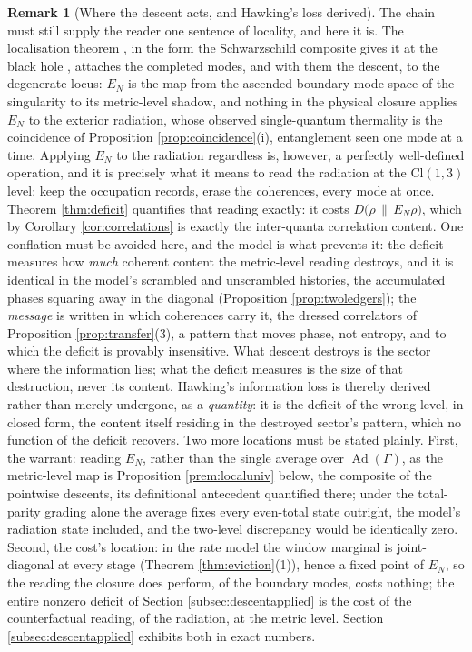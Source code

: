 \documentclass[11pt]{article}
\theoremstyle{definition}
\newtheorem{remark}[theorem]{Remark}
\newcommand{\Cl}{\mathrm{Cl}}
\newcommand{\EN}{E_{N}}
\newcommand{\rel}[2]{D\bigl(#1 \,\|\, #2\bigr)}
\begin{document}
\begin{remark}[Where the descent acts, and Hawking's loss derived]\label{rem:wheredescent}
The chain must still supply the reader one sentence of locality, and here it is. The localisation theorem \cite[Thm.~4.4, Cor.~4.5]{ButlerT4}, in the form the Schwarzschild composite gives it at the black hole \cite[Thms 8.7, 8.12]{ButlerT4}, attaches the completed modes, and with them the descent, to the degenerate locus: $\EN$ is the map from the ascended boundary mode space of the singularity to its metric-level shadow, and nothing in the physical closure applies $\EN$ to the exterior radiation, whose observed single-quantum thermality is the coincidence of Proposition \ref{prop:coincidence}(i), entanglement seen one mode at a time. Applying $\EN$ to the radiation regardless is, however, a perfectly well-defined operation, and it is precisely what it means to read the radiation at the $\Cl(1,3)$ level: keep the occupation records, erase the coherences, every mode at once. Theorem \ref{thm:deficit} quantifies that reading exactly: it costs $\rel{\rho}{\EN\rho}$, which by Corollary \ref{cor:correlations} is exactly the inter-quanta correlation content. One conflation must be avoided here, and the model is what prevents it: the deficit measures how \emph{much} coherent content the metric-level reading destroys, and it is identical in the model's scrambled and unscrambled histories, the accumulated phases squaring away in the diagonal (Proposition \ref{prop:twoledgers}); the \emph{message} is written in which coherences carry it, the dressed correlators of Proposition \ref{prop:transfer}(3), a pattern that moves phase, not entropy, and to which the deficit is provably insensitive. What descent destroys is the sector where the information lies; what the deficit measures is the size of that destruction, never its content. Hawking's information loss is thereby derived rather than merely undergone, as a \emph{quantity}: it is the deficit of the wrong level, in closed form, the content itself residing in the destroyed sector's pattern, which no function of the deficit recovers. Two more locations must be stated plainly. First, the warrant: reading $\EN$, rather than the single average over $\operatorname{Ad}(\Gamma)$, as the metric-level map is Proposition \ref{prem:localuniv} below, the composite of the pointwise descents, its definitional antecedent quantified there; under the total-parity grading alone the average fixes every even-total state outright, the model's radiation state included, and the two-level discrepancy would be identically zero. Second, the cost's location: in the rate model the window marginal is joint-diagonal at every stage (Theorem \ref{thm:eviction}(1)), hence a fixed point of $\EN$, so the reading the closure does perform, of the boundary modes, costs nothing; the entire nonzero deficit of Section \ref{subsec:descentapplied} is the cost of the counterfactual reading, of the radiation, at the metric level. Section \ref{subsec:descentapplied} exhibits both in exact numbers.
\end{remark}
\end{document}
